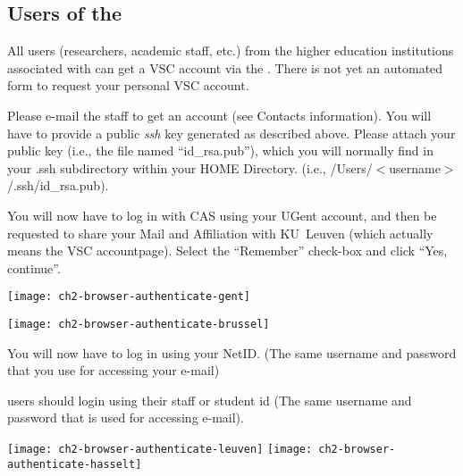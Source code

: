 \subsection{Users of the \association}
\label{sec:users-of-association}

All users (researchers, academic staff, etc.) from the higher education
institutions associated with \university can get a VSC account via the \university. There is not
yet an automated form to request your personal VSC account.

Please e-mail the \hpc staff to get an account (see Contacts information).
You will have to provide a public \emph{ssh} key generated as described
above. Please attach your public key (i.e., the file named ``id\_rsa.pub''),
which you will normally find in your .ssh subdirectory within your HOME
Directory. (i.e., /Users/$<$username$>$/.ssh/id\_rsa.pub).


\fi %

\ifgent
  You will now have to log in with CAS using your UGent account, and then be requested
  to share your Mail and Affiliation with KU~Leuven (which actually means the VSC accountpage).
  Select the ``Remember'' check-box and click ``Yes, continue''.
  \begin{center}
  \texttt{[image: ch2-browser-authenticate-gent]}
  \end{center}
\fi

\ifbrussel
  \begin{center}
  \texttt{[image: ch2-browser-authenticate-brussel]}
  \end{center}

  You will now have to log in using your NetID. (The same username and password that you use for accessing your e-mail)

\fi

\ifleuven
\hpc users should login using their staff or student id
(The same username and password that is used for accessing e-mail).

 \begin{center}
  \texttt{[image: ch2-browser-authenticate-leuven]}
  \texttt{[image: ch2-browser-authenticate-hasselt]}
  \end{center}


\fi


